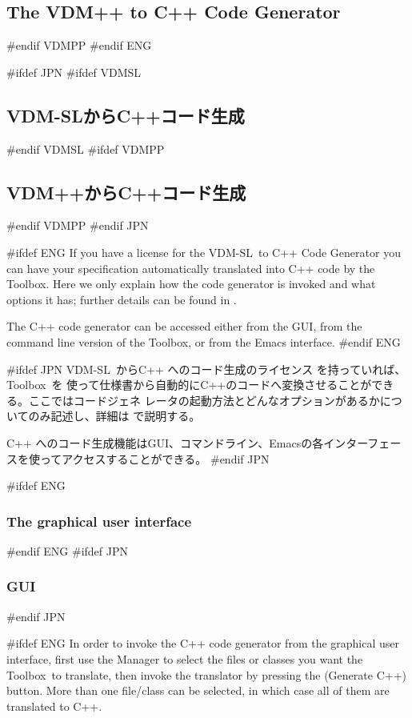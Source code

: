\documentclass[\pformat,12pt]{article}
\newcommand{\vdmslpp}{VDM-SL}
\newcommand{\Toolbox}{Toolbox}
\newcommand{\vdmslpp}{VDM++}
\newcommand{\Toolbox}{Toolbox}
\newcommand{\guicmd}[1]{{\sf #1}}
\newcommand{\guicmd}[1]{{\gt #1}}
\begin{document}
\subsection{The VDM++ to C++ Code Generator}\label{sec:cg}
#endif VDMPP
#endif ENG

#ifdef JPN
#ifdef VDMSL
\subsection{VDM-SLからC++コード生成}\label{sec:cg}
#endif VDMSL
#ifdef VDMPP
\subsection{VDM++からC++コード生成}\label{sec:cg}
#endif VDMPP
#endif JPN

#ifdef ENG
If you have a license  for the \vdmslpp\ to C++
Code Generator you can have your specification automatically 
translated into C++ code by the \Toolbox. Here we only explain how the
code generator is invoked and what options it has; further details can
be found in .

The C++ code generator can be accessed either from the GUI, from the
command line version of the \Toolbox, or from the Emacs interface.
#endif ENG

#ifdef JPN
\vdmslpp\  からC++ へのコード生成のライセンス を持っていれば、\Toolbox\ を
使って仕様書から自動的にC++のコードへ変換させることができる。ここではコードジェネ
レータの起動方法とどんなオプションがあるかについてのみ記述し、詳細は%
で説明する。

C++ へのコード生成機能はGUI、コマンドライン、Emacsの各インターフェースを使ってアクセスすることができる。
#endif JPN

#ifdef ENG
\subsubsection{The graphical user interface}
#endif ENG
#ifdef JPN
\subsubsection{GUI}
#endif JPN

#ifdef ENG
In order to invoke the C++ code generator from the graphical user
interface, first use the \guicmd{Manager} to select the files or
classes you want the \Toolbox\ to translate, then invoke the
translator by pressing the 
(\guicmd{Generate C++}) button. More than one file/class can be
selected, in which case all of them are translated to C++.
\end{document}
